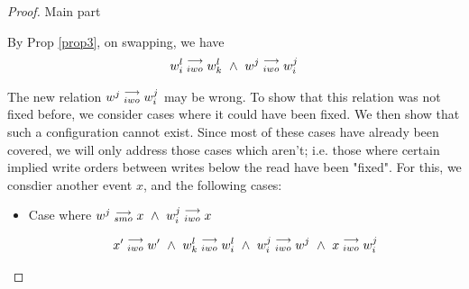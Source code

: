 \begin{proof}{Main part}
\begin{itemize}
                        By Prop \ref{prop3}, on swapping, we have 
                        \begin{align*}
                            \reln{w_i^l}{iwo}{w_k^l} \ \wedge \ \reln{w^j}{iwo}{w_i^j}
                        \end{align*}

                        The new relation $w^j\stackrel{\longrightarrow}{_{iwo}}w_i^j$ may be wrong. 
                        To show that this relation was not fixed before, we consider cases where it could have been fixed. We then show that such a configuration cannot exist. Since most of these cases have already been covered, we will only address those cases which aren't; i.e. those where certain implied write orders between writes below the read have been "fixed". For this, we consdier another event $x$, and the following cases:

                        \begin{itemize}
                            \item Case where $w^j\stackrel{\longrightarrow}{_{smo}}x \ \wedge \ w_i^j\stackrel{\longrightarrow}{_{iwo}}x$
                                
                                \begin{align*}
                                    \reln{x'}{iwo}{w'} \ \wedge \ \reln{w_k^l}{iwo}{w_i^l} \ \wedge \ \reln{w_i^j}{iwo}{w^j} \ \wedge \ \reln{x}{iwo}{w_i^j} 
                                \end{align*}


\end{itemize}
\end{itemize}
\end{proof}
